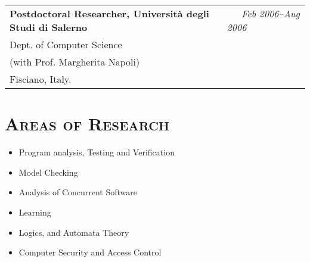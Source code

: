 \begin{resume}
\begin{tabular}{@{}p{4.6in}p{1.8in}}
{\bf Postdoctoral  Researcher, Universit\`a degli Studi di Salerno} & \emph{~~~Feb 2006--Aug 2006}  \\
Dept. of Computer Science &~\\
(with Prof. Margherita Napoli)~\\
Fisciano, Italy.~\\
\end{tabular}






\section{\bfseries \scshape  Areas of Research}
\begin{itemize}

\item Program analysis, Testing and Verification
\item Model Checking 
\item Analysis of Concurrent Software
\item Learning
\item Logics, and Automata Theory 
\item Computer Security and Access Control
\end{itemize}





\end{resume}
